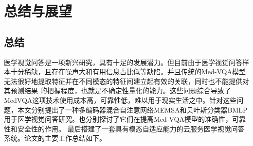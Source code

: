 \chapter{总结与展望}

\section*{总结}


医学视觉问答是一项新兴研究，具有十足的发展潜力。但目前由于医学视觉问答样本十分稀缺，且存在噪声大和有用信息占比低等缺陷。并且传统的Med-VQA模型无法很好地提取特征并在不同模态的特征间建立起有效的关联，同时也不能提供对其预测结果
的把握程度，也就是不确定性量化的能力。这些问题综合导致了MedVQA这项技术使用成本高，可靠性低，难以用于现实生活之中。针对这些问题，本文分别提出了一种多编码器混合自注意网络MEMSA和贝叶斯分类器BMLP用于医学视觉问答研究。也分别探讨了它们在提高Med-VQA模型的准确性，可靠性和安全性的作用。
最后搭建了一套具有模态自适应能力的云服务医学视觉问答系统。论文的主要工作总结如下。

